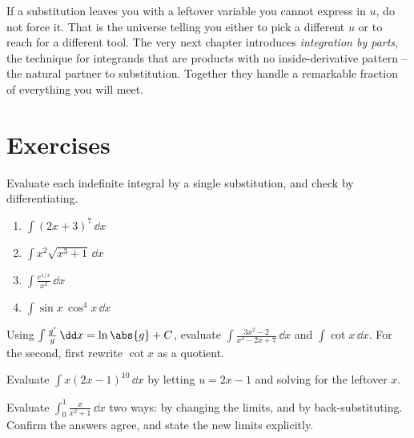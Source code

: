\begin{recoverybox}
If a substitution leaves you with a leftover variable you cannot express in $u$, do
not force it. That is the universe telling you either to pick a different $u$ or to
reach for a different tool. The very next chapter introduces \emph{integration by
parts}, the technique for integrands that are products with no inside-derivative
pattern -- the natural partner to substitution. Together they handle a remarkable
fraction of everything you will meet.
\end{recoverybox}

\section{Exercises}
\label{ch22:exercises}

\begin{exercise}
Evaluate each indefinite integral by a single substitution, and check by
differentiating.
\begin{enumerate}
\item $\displaystyle \int (2x+3)^7\,\dd x$
\item $\displaystyle \int x^2\sqrt{x^3+1}\,\dd x$
\item $\displaystyle \int \frac{e^{1/x}}{x^2}\,\dd x$
\item $\displaystyle \int \sin x\,\cos^4 x\,\dd x$
\end{enumerate}
\end{exercise}

\begin{exercise}
Using $\int \frac{g'}{g}\,\dd x = \ln\abs{g} + C$, evaluate
$\displaystyle \int \frac{3x^2 - 2}{x^3 - 2x + 7}\,\dd x$ and
$\displaystyle \int \cot x\,\dd x$. For the second, first rewrite $\cot x$ as a
quotient.
\end{exercise}

\begin{exercise}
Evaluate $\displaystyle \int x(2x-1)^{10}\,\dd x$ by letting $u = 2x-1$ and solving
for the leftover $x$.
\end{exercise}

\begin{exercise}
Evaluate $\displaystyle \int_0^{1} \frac{x}{x^2+1}\,\dd x$ two ways: by changing the
limits, and by back-substituting. Confirm the answers agree, and state the new
limits explicitly.
\end{exercise}

